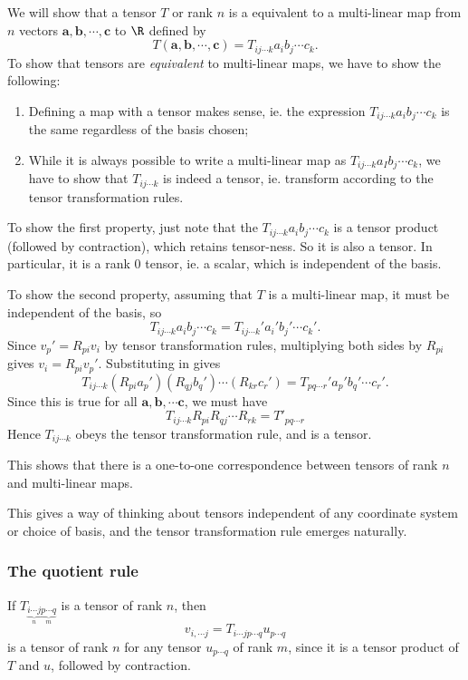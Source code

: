 \documentclass[a4paper]{article}
\begin{document}
We will show that a tensor $T$ or rank $n$ is a equivalent to a multi-linear map from $n$ vectors $\mathbf{a}, \mathbf{b}, \cdots, \mathbf{c}$ to $\R$ defined by
\[
  T(\mathbf{a}, \mathbf{b}, \cdots, \mathbf{c}) = T_{ij \cdots k} a_ib_j\cdots c_k.
\]
To show that tensors are \emph{equivalent} to multi-linear maps, we have to show the following:
\begin{enumerate}
  \item Defining a map with a tensor makes sense, ie. the expression $T_{ij\cdots k}a_ib_j\cdots c_k$ is the same regardless of the basis chosen;
  \item While it is always possible to write a multi-linear map as $T_{ij \cdots k} a_Ib_j\cdots c_k$, we have to show that $T_{ij\cdots k}$ is indeed a tensor, ie. transform according to the tensor transformation rules.
\end{enumerate}

To show the first property, just note that the $T_{ij \cdots k} a_ib_j\cdots c_k$ is a tensor product (followed by contraction), which retains tensor-ness. So it is also a tensor. In particular, it is a rank 0 tensor, ie. a scalar, which is independent of the basis.

To show the second property, assuming that $T$ is a multi-linear map, it must be independent of the basis, so
\[
  T_{ij \cdots k} a_ib_j\cdots c_k = T_{ij\cdots k}' a_i' b_j' \cdots c_k'.
\]
Since $v_p' = R_{pi}v_i$ by tensor transformation rules, multiplying both sides by $R_{pi}$ gives $v_i = R_{pi} v_p'$. Substituting in gives
\[
  T_{ij\cdots k} (R_{pi}a_p')(R_{qj}b_q')\cdots (R_{kr}c_r') = T_{pq\cdots r}' a_p' b_q' \cdots c_r'.
\]
Since this is true for all $\mathbf{a}, \mathbf{b}, \cdots \mathbf{c}$, we must have
\[
  T_{ij\cdots k}R_{pi}R_{qj}\cdots R_{rk} = T'_{pq\cdots r}
\]
Hence $T_{ij\cdots k}$ obeys the tensor transformation rule, and is a tensor.

This shows that there is a one-to-one correspondence between tensors of rank $n$ and multi-linear maps.

This gives a way of thinking about tensors independent of any coordinate system or choice of basis, and the tensor transformation rule emerges naturally.

\subsubsection{The quotient rule}
If $T_{\underbrace{i\cdots j}_n\underbrace{p\cdots q}_m}$ is a tensor of rank $n$, then
\[
  v_{i, \cdots j}= T_{i\cdots j p\cdots q}u_{p\cdots q}
\]
is a tensor of rank $n$ for any tensor $u_{p \cdots q}$ of rank $m$, since it is a tensor product of $T$ and $u$, followed by contraction.
\end{document}
